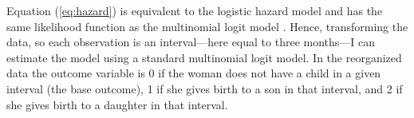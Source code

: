 \documentclass[12pt,letterpaper]{article}
\begin{document}
Equation (\ref{eq:hazard}) is equivalent to the logistic hazard model and has the same 
likelihood function as the multinomial logit model \citep{allison82,jenkins95}.
Hence, transforming the data, so each observation is an interval---here equal
to three months---I can estimate the model using a standard multinomial logit model.
%
In the reorganized data the outcome variable is 0 if the woman does not have a child in a 
given interval (the base outcome), 1 if she gives birth to a son in that interval, and 2 
if she gives birth to a daughter in that interval.

% 
\end{document}
